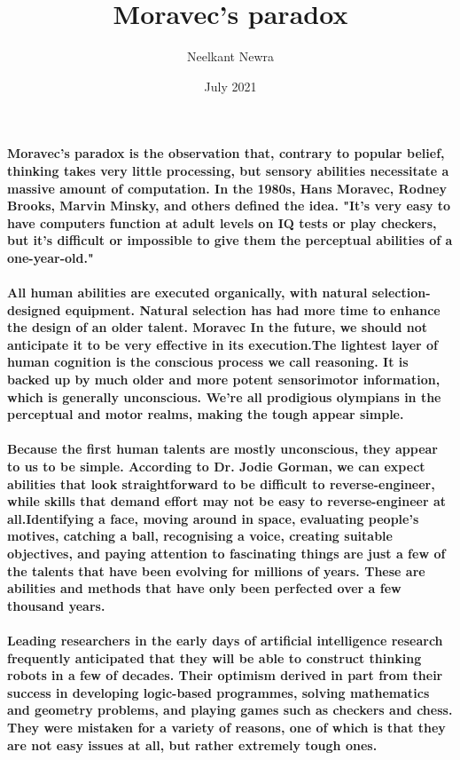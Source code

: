 \documentclass{article}
\title{\vspace{-2cm}Moravec's paradox}
\author{Neelkant Newra }
\date{July 2021}
\begin{document}
	
	\maketitle 
	\paragraph{ Moravec's paradox is the observation that, contrary to popular belief, thinking takes very little processing, but sensory abilities necessitate a massive amount of computation. In the 1980s, Hans Moravec, Rodney Brooks, Marvin Minsky, and others defined the idea. "It's very easy to have computers function at adult levels on IQ tests or play checkers, but it's difficult or impossible to give them the perceptual abilities of a one-year-old."}
	
	\paragraph{ All human abilities are executed organically, with natural selection-designed equipment. Natural selection has had more time to enhance the design of an older talent. Moravec In the future, we should not anticipate it to be very effective in its execution.The lightest layer of human cognition is the conscious process we call reasoning. It is backed up by much older and more potent sensorimotor information, which is generally unconscious. We're all prodigious olympians in the perceptual and motor realms, making the tough appear simple.}
	
	\paragraph{Because the first human talents are mostly unconscious, they appear to us to be simple. According to Dr. Jodie Gorman, we can expect abilities that look straightforward to be difficult to reverse-engineer, while skills that demand effort may not be easy to reverse-engineer at all.Identifying a face, moving around in space, evaluating people's motives, catching a ball, recognising a voice, creating suitable objectives, and paying attention to fascinating things are just a few of the talents that have been evolving for millions of years. These are abilities and methods that have only been perfected over a few thousand years.}
	
	\paragraph{Leading researchers in the early days of artificial intelligence research frequently anticipated that they will be able to construct thinking robots in a few of decades. Their optimism derived in part from their success in developing logic-based programmes, solving mathematics and geometry problems, and playing games such as checkers and chess. They were mistaken for a variety of reasons, one of which is that they are not easy issues at all, but rather extremely tough ones.}
	
\end{document}
